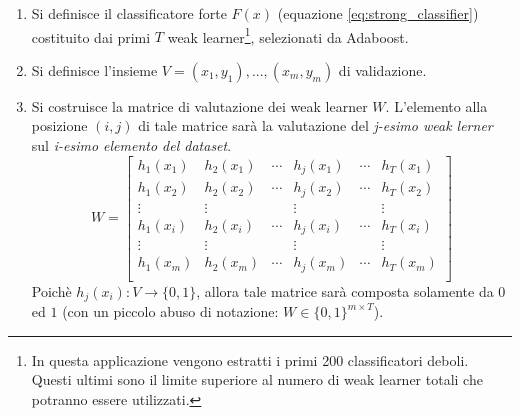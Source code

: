             \begin{enumerate}
                \item Si definisce il classificatore forte $F(x)$ (equazione \ref{eq:strong_classifier}) costituito dai primi $T$  weak learner\footnote{In questa applicazione vengono estratti i primi 200 classificatori deboli. Questi ultimi sono il limite superiore al numero di weak learner totali che potranno essere utilizzati.}, selezionati da Adaboost.

                \item Si definisce l'insieme $V = {(x_1, y_1),..., (x_m, y_m)}$ di validazione.

                \item Si costruisce la matrice di valutazione dei weak learner $W$. L'elemento alla posizione $(i,j)$ di tale matrice sarà la valutazione del \emph{j-esimo weak lerner} sul \emph{i-esimo elemento del dataset}.
                \begin{equation}
                    \label{subeq:wl_valuation_matrix}
                    W = \left[
                    \begin{array}{cccccc}
                        h_1(x_1) & h_2(x_1) & \cdots & h_j(x_1) & \cdots & h_T(x_1)\\
                        h_1(x_2) & h_2(x_2) & \cdots & h_j(x_2) & \cdots & h_T(x_2)\\
                        \vdots & \vdots & & \vdots & & \vdots \\
                        h_1(x_i) & h_2(x_i) & \cdots & h_j(x_i) & \cdots & h_T(x_i)\\
                        \vdots & \vdots & & \vdots & & \vdots \\
                        h_1(x_m) & h_2(x_m) & \cdots & h_j(x_m) & \cdots & h_T(x_m)\\
                    \end{array}
                    \right]
                \end{equation}
                Poichè $h_j(x_i): V \rightarrow \{0,1\}$, allora tale matrice sarà composta solamente da $0$ ed $1$ (con un piccolo abuso di notazione: $W \in \{0,1\}^{m \times T}$).


\end{enumerate}
